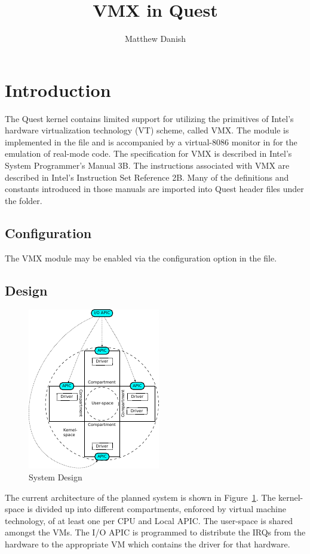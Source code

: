 \documentclass[twocolumn]{article}
\title{VMX in Quest}
\author{Matthew Danish}
\newcommand\optn[1]{{\path {#1}}}
\begin{document}
\maketitle
\section{Introduction}
The Quest kernel contains limited support for utilizing the primitives
of Intel's hardware virtualization technology (VT) scheme, called VMX.
The module is implemented in the  file and is
accompanied by a virtual-8086 monitor in  for the
emulation of real-mode code.  The specification for VMX is described
in Intel's System Programmer's Manual 3B.  The instructions associated
with VMX are described in Intel's Instruction Set Reference 2B.  Many
of the definitions and constants introduced in those manuals are
imported into Quest header files under the  folder.

\subsection{Configuration}
The VMX module may be enabled via the configuration option
\optn{USE_VMX} in the  file.

\subsection{Design}
\begin{figure}[hbt]
  \centering
  \includegraphics{vm-design}  
  \caption{System Design}
\label{fig:design}
\end{figure}
The current architecture of the planned system is shown in
Figure~\ref{fig:design}.  The kernel-space is divided up into
different compartments, enforced by virtual machine technology, of at
least one per CPU and Local APIC.  The user-space is shared amongst
the VMs.  The I/O APIC is programmed to distribute the IRQs from the
hardware to the appropriate VM which contains the driver for that
hardware.
\end{document}
